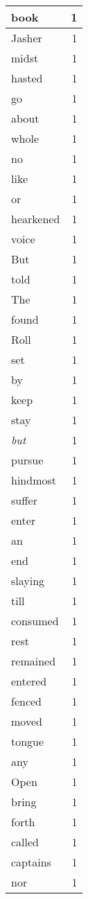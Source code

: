 \begin{center}
\begin{longtable}{l|r}
book & 1 \\ \hline
Jasher & 1 \\ \hline
midst & 1 \\ \hline
hasted & 1 \\ \hline
go & 1 \\ \hline
about & 1 \\ \hline
whole & 1 \\ \hline
no & 1 \\ \hline
like & 1 \\ \hline
or & 1 \\ \hline
hearkened & 1 \\ \hline
voice & 1 \\ \hline
But & 1 \\ \hline
told & 1 \\ \hline
The & 1 \\ \hline
found & 1 \\ \hline
Roll & 1 \\ \hline
set & 1 \\ \hline
by & 1 \\ \hline
keep & 1 \\ \hline
stay & 1 \\ \hline
\emph{but} & 1 \\ \hline
pursue & 1 \\ \hline
hindmost & 1 \\ \hline
suffer & 1 \\ \hline
enter & 1 \\ \hline
an & 1 \\ \hline
end & 1 \\ \hline
slaying & 1 \\ \hline
till & 1 \\ \hline
consumed & 1 \\ \hline
rest & 1 \\ \hline
remained & 1 \\ \hline
entered & 1 \\ \hline
fenced & 1 \\ \hline
moved & 1 \\ \hline
tongue & 1 \\ \hline
any & 1 \\ \hline
Open & 1 \\ \hline
bring & 1 \\ \hline
forth & 1 \\ \hline
called & 1 \\ \hline
captains & 1 \\ \hline
nor & 1 \\ \hline

\end{longtable}
\end{center}
